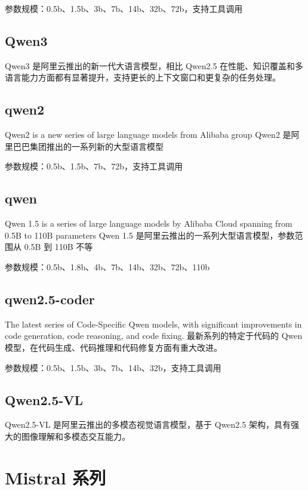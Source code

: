 \documentclass[12pt,UTF8]{ctexbook}
\begin{document}
参数规模：0.5b、1.5b、3b、7b、14b、32b、72b，支持工具调用

\subsection{Qwen3}

Qwen3 是阿里云推出的新一代大语言模型，相比 Qwen2.5 在性能、知识覆盖和多语言能力方面都有显著提升，支持更长的上下文窗口和更复杂的任务处理。

\subsection{qwen2}

Qwen2 is a new series of large language models from Alibaba group
Qwen2 是阿里巴巴集团推出的一系列新的大型语言模型

参数规模：0.5b、1.5b、7b、72b，支持工具调用

\subsection{qwen}

Qwen 1.5 is a series of large language models by Alibaba Cloud spanning from 0.5B to 110B parameters
Qwen 1.5 是阿里云推出的一系列大型语言模型，参数范围从 0.5B 到 110B 不等

参数规模：0.5b、1.8b、4b、7b、14b、32b、72b、110b

\subsection{qwen2.5-coder}

The latest series of Code-Specific Qwen models, with significant improvements in code generation, code reasoning, and code fixing.
最新系列的特定于代码的 Qwen 模型，在代码生成、代码推理和代码修复方面有重大改进。

参数规模：0.5b、1.5b、3b、7b、14b、32b，支持工具调用

\subsection{Qwen2.5-VL}

Qwen2.5-VL 是阿里云推出的多模态视觉语言模型，基于 Qwen2.5 架构，具有强大的图像理解和多模态交互能力。

\section{Mistral 系列}
\end{document}
